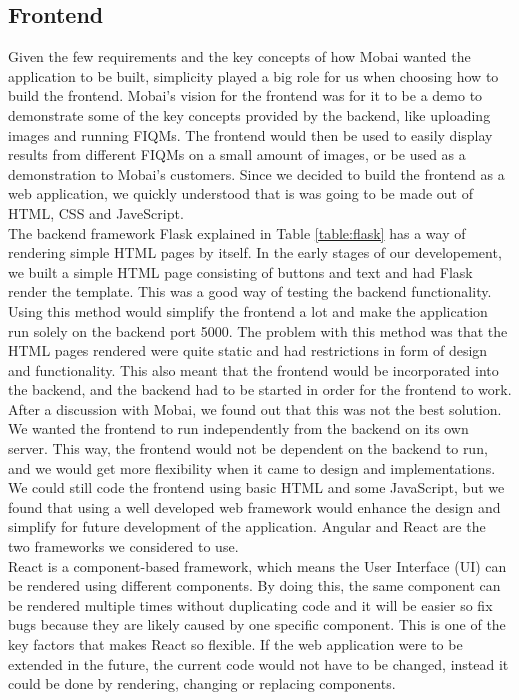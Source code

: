 \subsection*{Frontend}
Given the few requirements and the key concepts of how Mobai wanted the application to be built, simplicity played a big role for us when choosing how to build the frontend. Mobai's vision for the frontend was for it to be a demo to demonstrate some of the key concepts provided by the backend, like uploading images and running FIQMs. The frontend would then be used to easily display results from different FIQMs on a small amount of images, or be used as a demonstration to Mobai's customers. Since we decided to build the frontend as a web application, we quickly understood that is was going to be made out of HTML, CSS and JaveScript. \\

The backend framework Flask explained in Table \ref{table:flask}  has a way of rendering simple HTML pages by itself. In the early stages of our developement, we built a simple HTML page consisting of buttons and text and had Flask render the template. This was a good way of testing the backend functionality. Using this method would simplify the frontend a lot and make the application run solely on the backend port 5000. The problem with this method was that the HTML pages rendered were quite static and had restrictions in form of design and functionality. This also meant that the frontend would be incorporated into the backend, and the backend had to be started in order for the frontend to work. After a discussion with Mobai, we found out that this was not the best solution. \\

We wanted the frontend to run independently from the backend on its own server. This way, the frontend would not be dependent on the backend to run, and we would get more flexibility when it came to design and implementations. We could still code the frontend using basic HTML and some JavaScript, but we found that using a well developed web framework would enhance the design and simplify for future development of the application. Angular and React are the two frameworks we considered to use.  \\

React is a component-based framework, which means the User Interface (UI) can be rendered using different components. By doing this, the same component can be rendered multiple times without duplicating code and it will be easier so fix bugs because they are likely caused by one specific component. This is one of the key factors that makes React so flexible. If the web application were to be extended in the future, the current code would not have to be changed, instead it could be done by rendering, changing or replacing components. \\

